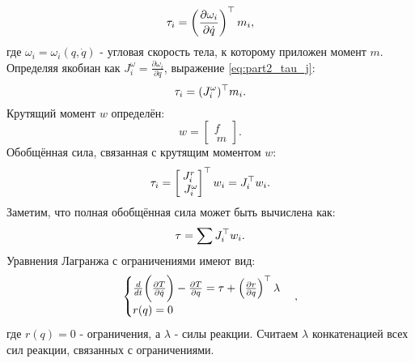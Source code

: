 \begin{equation}
	\label{eq:part2_tau_j}
	\tau_i = \left( \frac{\partial \omega_i}{\partial \dot{{q}}} \right)^\top {m}_i,
\end{equation}
%
где $\omega_i = \omega_i({q}, \dot{{q}})$ - угловая скорость тела, к которому приложен момент ${m}$.
Определяя якобиан как ${J}^\omega_i = \frac{\partial \omega_i}{\partial \dot{{q}}}$, выражение \eqref{eq:part2_tau_j}:
%
\begin{equation}
\tau_i = ({J}^\omega_i)^\top {m}_i.
\end{equation}
Крутящий момент ${w}$ определён:
\begin{equation}
	{w} = \begin{bmatrix}
		{f} \\\ {m}
	\end{bmatrix}.
\end{equation}
%
Обобщённая сила, связанная с крутящим моментом  ${w}$:
%
\begin{equation}
	\tau_i = \begin{bmatrix}
		{J}^r_i \\\ {J}^\omega_i
	\end{bmatrix}^\top
	{w}_i
	=
	{J}_i^\top {w}_i.
\end{equation}
Заметим, что полная обобщённая сила может быть вычислена как:
%
\begin{equation}
	\tau = \sum {J}_i^\top {w}_i.
\end{equation}
%
Уравнения Лагранжа с ограничениями имеют вид:
%
\begin{equation}
	\begin{cases}
		\frac{d}{dt} \bigg( 
		\frac{\partial T }{\partial \dot{{q}}}
		\bigg) - 
		\frac{\partial T }{\partial {q}} = \tau + \left( \frac{\partial {r}}{\partial {q}} \right)^\top \lambda
		\\
		{r}({q}) = 0
	\end{cases},
\end{equation}
%
где ${r}({q}) = 0$ - ограничения, а $\lambda$ - силы реакции. Считаем $\lambda$ конкатенацией всех сил реакции, связанных с ограничениями.

